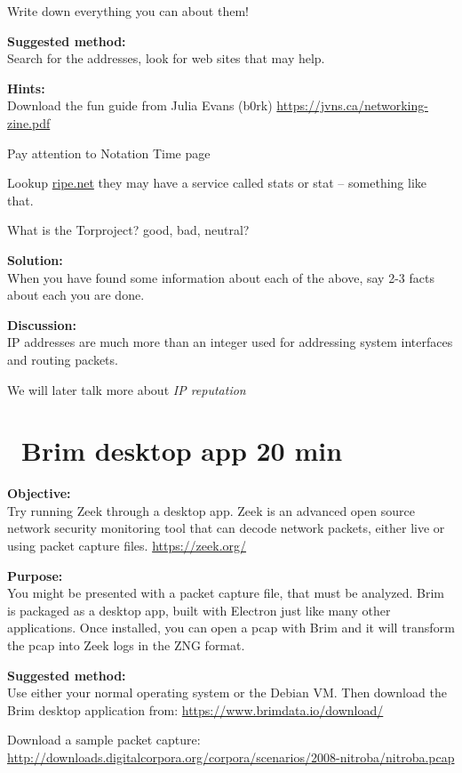 \documentclass[a4paper,11pt,notitlepage]{report}
\begin{document}
Write down everything you can about them!

{\bf Suggested method:}\\
Search for the addresses, look for web sites that may help.

{\bf Hints:}\\
Download the fun guide from Julia Evans (b0rk) \url{https://jvns.ca/networking-zine.pdf}

Pay attention to Notation Time page

Lookup \url{ripe.net} they may have a service called stats or stat -- something like that.

What is the Torproject? good, bad, neutral?

{\bf Solution:}\\
When you have found some information about each of the above, say 2-3 facts about each you are done.

{\bf Discussion:}\\
IP addresses are much more than an integer used for addressing system interfaces and routing packets.

We will later talk more about \emph{IP reputation}


\chapter{\faExclamationTriangle\ Brim desktop app 20 min}
\label{ex:brim-security}


{\bf Objective:}\\
Try running Zeek through a desktop app. Zeek is an advanced open source network security monitoring tool that can decode network packets, either live or using packet capture files. \url{https://zeek.org/}

{\bf Purpose:}\\
You might be presented with a packet capture file, that must be analyzed. Brim is packaged as a desktop app, built with Electron just like many other applications. Once installed, you can open a pcap with Brim and it will transform the pcap into Zeek logs in the ZNG format.

{\bf Suggested method:}\\
Use either your normal operating system or the Debian VM. Then download the Brim desktop application from:
\url{https://www.brimdata.io/download/}

Download a sample packet capture:\\
\url{http://downloads.digitalcorpora.org/corpora/scenarios/2008-nitroba/nitroba.pcap}
\end{document}
